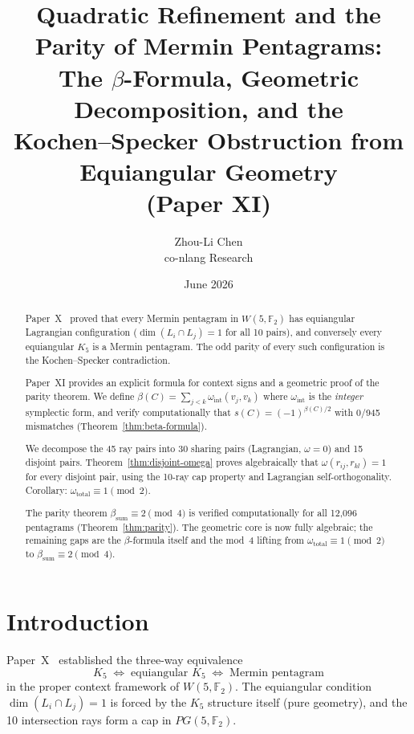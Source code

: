 \documentclass[11pt,a4paper]{article}
\title{Quadratic Refinement and the Parity of Mermin Pentagrams:\\
       The $\beta$-Formula, Geometric Decomposition, and the\\
       Kochen--Specker Obstruction from Equiangular Geometry\\
       {\large (Paper XI)}}
\author{Zhou-Li Chen \\ co-nlang Research}
\date{June 2026}
\theoremstyle{remark}
\newcommand{\F}{\mathbb{F}}
\begin{document}
\maketitle

\begin{abstract}
  Paper~X~\cite{PaperX} proved that every Mermin pentagram in
  $W(5, \F_2)$ has equiangular Lagrangian configuration
  ($\dim(L_i \cap L_j) = 1$ for all 10 pairs), and conversely every
  equiangular $K_5$ is a Mermin pentagram. The odd parity of every
  such configuration is the Kochen--Specker contradiction.

  Paper~XI provides an explicit formula for context signs and a
  geometric proof of the parity theorem. We define
  $\beta(C) = \sum_{j<k} \omega_{\text{int}}(v_j, v_k)$ where
  $\omega_{\text{int}}$ is the \emph{integer} symplectic form, and
  verify computationally that $s(C) = (-1)^{\beta(C)/2}$ with
  0/945 mismatches (Theorem~\ref{thm:beta-formula}).

  We decompose the 45 ray pairs into 30 sharing pairs (Lagrangian,
  $\omega = 0$) and 15 disjoint pairs. Theorem~\ref{thm:disjoint-omega}
  proves algebraically that $\omega(r_{ij}, r_{kl}) = 1$ for every
  disjoint pair, using the 10-ray cap property and Lagrangian
  self-orthogonality. Corollary: $\omega_{\text{total}} \equiv 1
  \pmod{2}$.

  The parity theorem $\beta_{\text{sum}} \equiv 2 \pmod{4}$ is verified
  computationally for all 12{,}096 pentagrams
  (Theorem~\ref{thm:parity}). The geometric core is now fully
  algebraic; the remaining gaps are the $\beta$-formula itself and the
  mod~4 lifting from $\omega_{\text{total}} \equiv 1 \pmod{2}$ to
  $\beta_{\text{sum}} \equiv 2 \pmod{4}$.
\end{abstract}

\section{Introduction}
\label{sec:intro}

Paper~X~\cite{PaperX} established the three-way equivalence
\[
K_5 \;\Longleftrightarrow\; \text{equiangular } K_5
\;\Longleftrightarrow\; \text{Mermin pentagram}
\]
in the proper context framework of $W(5, \F_2)$. The equiangular
condition $\dim(L_i \cap L_j) = 1$ is forced by the $K_5$ structure
itself (pure geometry), and the 10 intersection rays form a cap in
$PG(5, \F_2)$.
\end{document}
